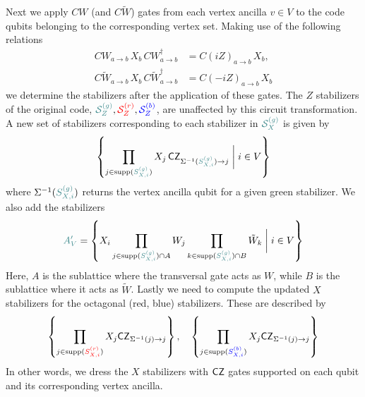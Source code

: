 \documentclass[11pt]{article}
\begin{document}
Next we apply $CW$ (and $C\tilde{W}$) gates from each vertex ancilla $v \in V$ to the code qubits belonging to the corresponding vertex set.  Making use of the following relations
\begin{align}
    CW_{a\rightarrow b}\,X_b\,CW_{a\rightarrow b}^\dagger &= C(i Z)_{a\rightarrow b}\, X_b, \\
    C\tilde{W}_{a\rightarrow b}\,X_b\,C\tilde{W}_{a\rightarrow b}^\dagger &= C(-i Z)_{a\rightarrow b}\, X_b
\end{align}
we determine the stabilizers after the application of these gates.  The $Z$ stabilizers of the original code, $\green{\mathcal{S}^{(g)}_Z}, \red{\mathcal{S}^{(r)}_Z}, \blue{\mathcal{S}^{(b)}_Z}$, are unaffected by this circuit transformation.  A new set of stabilizers corresponding to each stabilizer in $\green{\mathcal{S}^{(g)}_X}$ is given by \begin{equation}
    \left \{\prod_{j \in \mathrm{supp}(\green{S^{(g)}_{X,i}})} X_j \, \CZ_{\vertexset{\green{S^{(g)}_{X,i}}}\rightarrow j} \mathrel{\bigg|} i \in V \right \}
\end{equation} where $\vertexset{\green{S^{(g)}_{X,i}}}$ returns the vertex ancilla qubit for a given green stabilizer.  We also add the stabilizers 
\begin{equation}
    \green{A_V'} = \left \{X_i \prod_{j \in \mathrm{supp}(\green{S^{(g)}_{X,i}}) \cap A} W_{j}  \prod_{k \in \mathrm{supp}(\green{S^{(g)}_{X,i}}) \cap B} \tilde{W}_{k} \mathrel{\bigg|} i \in V \right \}
\end{equation}
Here, $A$ is the sublattice where the transversal gate acts as $W$, while $B$ is the sublattice where it acts as $\tilde{W}$. Lastly we need to compute the updated $X$ stabilizers for the octagonal (red, blue) stabilizers.  These are described by 
\begin{equation}
    \left \{ \prod_{j \in \mathrm{supp}(\red{S^{(r)}_{X,i}})} X_j \CZ_{\Sigma^{-1}(j)\rightarrow j} \right \}, \quad \left \{ \prod_{j \in \mathrm{supp}(\blue{S^{(b)}_{X,i}})} X_j \CZ_{\Sigma^{-1}(j)\rightarrow j} \right \}
\end{equation}
In other words, we dress the $X$ stabilizers with $\mathsf{CZ}$ gates supported on each qubit and its corresponding vertex ancilla.  
\end{document}
